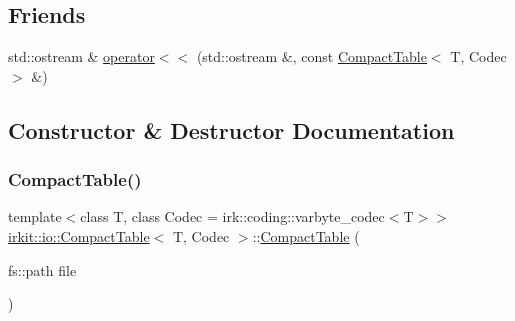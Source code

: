 \subsection*{Friends}
\begin{DoxyCompactItemize}
\item 
std\+::ostream \& \mbox{\hyperlink{classirkit_1_1io_1_1CompactTable_aca625eae690396584a3998222ddd856f}{operator$<$$<$}} (std\+::ostream \&, const \mbox{\hyperlink{classirkit_1_1io_1_1CompactTable}{Compact\+Table}}$<$ T, Codec $>$ \&)
\end{DoxyCompactItemize}


\subsection{Constructor \& Destructor Documentation}
\mbox{\label{classirkit_1_1io_1_1CompactTable_a8495884f1b4784f9f843097ae57952a9}} 
\subsubsection{\texorpdfstring{Compact\+Table()}{CompactTable()}\hspace{0.1cm}{\footnotesize\ttfamily [1/2]}}
{\footnotesize\ttfamily template$<$class T, class Codec = irk\+::coding\+::varbyte\+\_\+codec$<$\+T$>$$>$ \\
\mbox{\hyperlink{classirkit_1_1io_1_1CompactTable}{irkit\+::io\+::\+Compact\+Table}}$<$ T, Codec $>$\+::\mbox{\hyperlink{classirkit_1_1io_1_1CompactTable}{Compact\+Table}} (\begin{DoxyParamCaption}\item[{fs\+::path}]{file }\end{DoxyParamCaption})\hspace{0.3cm}{\ttfamily [inline]}}

\mbox{\label{classirkit_1_1io_1_1CompactTable_aa8377c46672196cf3d37615a5f4fa9fc}} 

